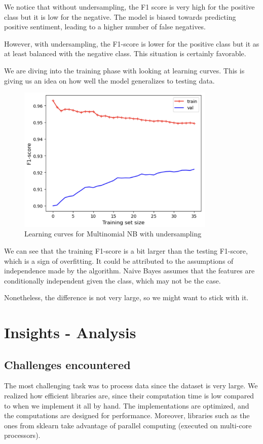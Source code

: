 \documentclass{article}
\begin{document}
We notice that without undersampling, the F1 score is very high for the positive class but it is low for the negative. The model is biased towards predicting positive sentiment, leading to a higher number of false negatives. 

However, with undersampling, the F1-score is lower for the positive class but it as at least balanced with the negative class. This situation is certainly favorable. 

We are diving into the training phase with looking at learning curves. This is giving us an idea on how well the model generalizes to testing data.

\begin{figure}[H]
  \centering
  \includegraphics[height=7cm]{nb_start_learning_curves.png}
  \caption{Learning curves for Multinomial NB with undersampling}
  \label{fig:image_label}
\end{figure}

We can see that the training F1-score is a bit larger than the testing F1-score, which is a sign of overfitting.
It could be attributed to the assumptions of independence made by the algorithm. Naive Bayes assumes that the features are conditionally independent given the class, which may not be the case.

Nonetheless, the difference is not very large, so we might want to stick with it.

\section{Insights - Analysis}

\subsection{Challenges encountered}

The most challenging task was to process data since the dataset is very large. We realized how efficient libraries are, since their computation time is low compared to when we implement it all by hand.
The implementations are optimized, and the computations are designed for performance. Moreover, libraries such as the ones from sklearn take advantage of parallel computing (executed on multi-core processors). 
\end{document}
